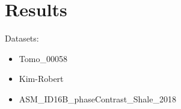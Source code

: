 \chapter{Results}
\label{sec:results}

Datasets:
\begin{itemize}
    \item Tomo\_00058
    \item Kim-Robert
    \item ASM\_ID16B\_phaseContrast\_Shale\_2018
\end{itemize}
